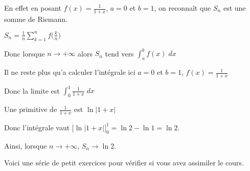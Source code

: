\change


En effet en posant $f(x)=\frac{1}{1+x}$, $a=0$ et $b=1$,
on reconnaît que $S_n$ est une somme de Riemann.

\change

$S_n=\tfrac{1}{n} \sum_{k=1}^{n} f\big(\tfrac kn\big)$

\change

Donc lorsque $n \to +\infty$ alors 
$S_n$ tend vers $\int_a^b f(x) \; dx$

\change

Il ne reste plus qu'a calculer l'intégrale 
ici $a=0$ et $b=1$, $f(x)=\frac{1}{1+x}$

Donc la limite est $\int_0^1 \frac{1}{1+x} \; dx$

\change 

Une primitive de $\frac{1}{1+x}$ est $\ln |1+x|$

Donc l'intégrale vaut 
$\big[\ln|1+x|\big]_0^1 = \ln 2-\ln 1 = \ln 2.$

\change 

Ainsi, lorsque $n\to +\infty$, $S_n \to \ln 2$.


\diapo

Voici une série de petit exercices pour vérifier si vous avez assimiler le cours.


